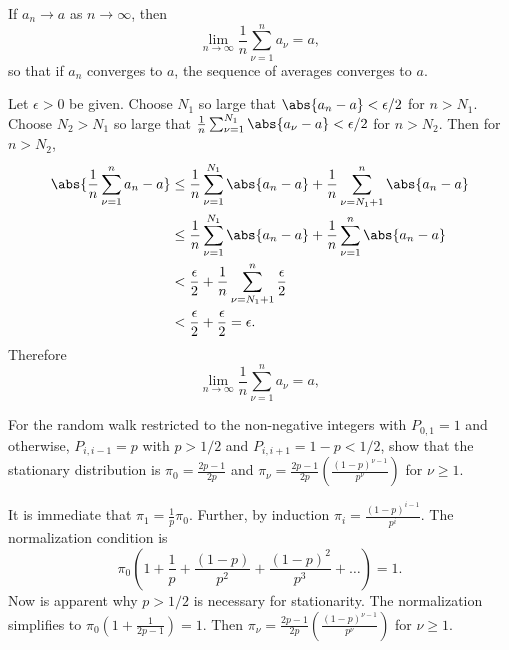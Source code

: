 \documentclass[12pt]{article}
\begin{document}
\begin{enumerate}
\begin{exercise}
    If \( a_n \to a \) as \( n \to \infty \), then
    \[
        \lim_{n \to \infty} \frac{1}{n} \sum\limits_{\nu=1}^{n} a_\nu =
        a,
    \] so that if \( a_n \) converges to \( a \), the sequence of
    averages converges to \( a \).
\end{exercise}
\begin{solution}
    Let \( \epsilon > 0 \) be given.  Choose \( N_1 \) so large that \(
    \abs{a_n - a} < \epsilon/2 \) for \( n > N_1 \).  Choose \( N_2 > N_1
    \) so large that \( \frac{1}{n} \sum_{\nu=1}^{N_1} \abs{a_{\nu} - a}
    < \epsilon/2 \) for \( n > N_2 \).  Then for \( n > N_2 \),
    \begin{align*}
        \abs{\frac{1}{n} \sum\limits_{\nu=1}^{n} a_n - a} &\le \frac{1}{n}
        \sum\limits_{\nu=1}^{N_1} \abs{a_n - a} + \frac{1}{n} \sum\limits_
        {\nu=N_1+1}^{n} \abs{a_n - a} \\
        &\le \frac{1}{n} \sum\limits_{\nu=1}^{N_1} \abs{a_n - a} + \frac
        {1}{n} \sum\limits_{\nu=1}^{n} \abs{a_n - a} \\
        &< \frac{\epsilon}{2} + \frac{1}{n} \sum\limits_{\nu=N_1+1}^{n}
        \frac{\epsilon}{2} \\
        &< \frac{\epsilon}{2} + \frac{\epsilon}{2} = \epsilon.
    \end{align*}
    Therefore
    \[
        \lim_{n \to \infty} \frac{1}{n} \sum\limits_{\nu=1}^{n} a_{\nu}
        = a,
    \]
\end{solution}

\begin{exercise}
For the  random walk restricted to the non-negative integers with
\( P_{0,1} = 1 \) and otherwise, \( P_{i,i-1} = p \) with \( p > 1/2 \)
and \( P_{i,i+1} = 1- p < 1/2 \), show that the stationary distribution is
\( \pi_0 = \frac{2p-1}{2p}
\) and \( \pi_{\nu} = \frac{2p-1}{2p} \left( \frac{(1-p)^{\nu -
      1}}{p^{\nu}} \right) \) for \( \nu \ge 1 \).
\end{exercise}
\begin{solution}
  It is immediate that \( \pi_1 = \frac{1}{p} \pi_0 \).  Further, by induction
  \( \pi_i = \frac{(1-p)^{i-1}}{p^i} \).  The normalization condition is
  \[
    \pi_0 \left( 1 + \frac{1}{p} + \frac{(1-p)}{p^2} + \frac{(1-p)^{2}}{p^3} + \dots \right) = 1.
  \]
  Now is apparent why \( p > 1/2 \) is necessary for stationarity. The
  normalization simplifies to \( \pi_0 \left( 1 + \frac{1}{2p-1} \right) = 1 \).  Then
  \( \pi_{\nu} = \frac{2p-1}{2p} \left( \frac{(1-p)^{\nu -
      1}}{p^{\nu}} \right) \) for \( \nu \ge 1 \).
\end{solution}
\hr


\end{enumerate}
\end{document}
